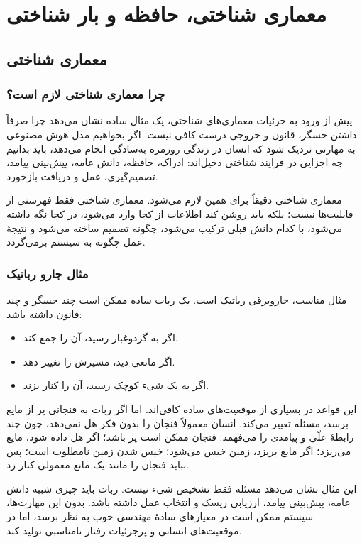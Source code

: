 \chapter{معماری شناختی، حافظه و بار شناختی}

\section{معماری شناختی}

\subsection{چرا معماری شناختی لازم است؟}
پیش از ورود به جزئیات معماری‌های شناختی، یک مثال ساده نشان می‌دهد چرا صرفاً داشتن حسگر، قانون و خروجی درست کافی نیست. اگر بخواهیم مدل هوش مصنوعی به مهارتی نزدیک شود که انسان در زندگی روزمره به‌سادگی انجام می‌دهد، باید بدانیم چه اجزایی در فرایند شناختی دخیل‌اند: ادراک، حافظه، دانش عامه، پیش‌بینی پیامد، تصمیم‌گیری، عمل و دریافت بازخورد.

معماری شناختی دقیقاً برای همین لازم می‌شود. معماری شناختی فقط فهرستی از قابلیت‌ها نیست؛ بلکه باید روشن کند اطلاعات از کجا وارد می‌شود، در کجا نگه داشته می‌شود، با کدام دانش قبلی ترکیب می‌شود، چگونه تصمیم ساخته می‌شود و نتیجهٔ عمل چگونه به سیستم برمی‌گردد.

\subsection{مثال جارو رباتیک}
مثال مناسب، جاروبرقی رباتیک است. یک ربات ساده ممکن است چند حسگر و چند قانون داشته باشد:
\begin{itemize}
  \item اگر به گردوغبار رسید، آن را جمع کند.
  \item اگر مانعی دید، مسیرش را تغییر دهد.
  \item اگر به یک شیء کوچک رسید، آن را کنار بزند.
\end{itemize}

این قواعد در بسیاری از موقعیت‌های ساده کافی‌اند. اما اگر ربات به فنجانی پر از مایع برسد، مسئله تغییر می‌کند. انسان معمولاً فنجان را بدون فکر هل نمی‌دهد، چون چند رابطهٔ علّی و پیامدی را می‌فهمد: فنجان ممکن است پر باشد؛ اگر هل داده شود، مایع می‌ریزد؛ اگر مایع بریزد، زمین خیس می‌شود؛ خیس شدن زمین نامطلوب است؛ پس نباید فنجان را مانند یک مانع معمولی کنار زد.

این مثال نشان می‌دهد مسئله فقط تشخیص شیء نیست. ربات باید چیزی شبیه دانش عامه، پیش‌بینی پیامد، ارزیابی ریسک و انتخاب عمل داشته باشد. بدون این مهارت‌ها، سیستم ممکن است در معیارهای سادهٔ مهندسی خوب به نظر برسد، اما در موقعیت‌های انسانی و پرجزئیات رفتار نامناسبی تولید کند.

